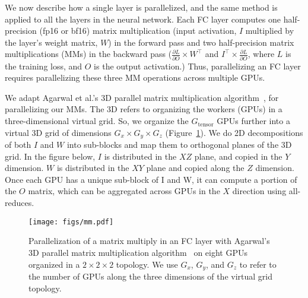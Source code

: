 We now describe how a single layer is parallelized, and the same method is
applied to all the layers in the neural network.  Each FC layer computes one
half-precision (fp16 or bf16) matrix multiplication (input activation, $I$
multiplied by the layer's weight matrix, $W$) in the forward pass and two
half-precision matrix multiplications (MMs) in the backward pass
($\frac{\partial L}{\partial O} \times W^{\top}$ and $I^{\top} \times
{\frac{\partial L}{\partial O}}$, where $L$ is the training loss, and $O$ is
the output activation.) Thus, parallelizing an FC layer requires parallelizing
these three MM operations across multiple GPUs.


We adapt Agarwal et al.'s 3D parallel matrix multiplication
algorithm~\cite{agarwal-3d}, for parallelizing our MMs. The 3D refers to
organizing the workers (GPUs) in a three-dimensional virtual grid.  So, we
organize the $G_{\mathrm{tensor}}$ GPUs further into a virtual 3D grid of
dimensions $G_x \times G_y \times G_z$
(Figure~\ref{fig:schematic-agarwal-data-dist}).  We do 2D decompositions of
both $I$ and $W$ into sub-blocks and map them to orthogonal planes of the 3D
grid. In the figure below, $I$ is distributed in the $XZ$ plane, and copied in the $Y$ dimension. $W$ is distributed in the $XY$ plane and copied along the $Z$ dimension. Once each GPU has a unique sub-block of I and W, it can compute a
portion of the $O$ matrix, which can be aggregated across GPUs in the $X$
direction using all-reduces.

\begin{figure}[h]
    \centering
      \texttt{[image: figs/mm.pdf]}
      \caption{Parallelization of a matrix multiply in an FC layer with Agarwal's 3D parallel matrix
multiplication algorithm~\cite{agarwal-3d} on eight GPUs organized in a
$2\times2\times2$ topology. We use $G_x$, $G_y$, and $G_z$ to refer to
the number of GPUs along the three dimensions of the virtual grid topology.}
      \label{fig:schematic-agarwal-data-dist}
\end{figure}

